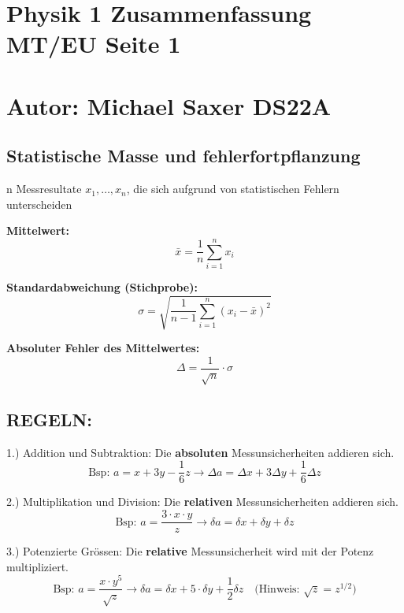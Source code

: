 \documentclass[a4paper, 8pt]{extarticle}
\begin{document}
\begin{landscape}
\section*{\hspace{10cm} Physik 1 Zusammenfassung MT/EU \hspace{8cm} \small Seite 1}
\section*{ \hspace{10cm} Autor: Michael Saxer DS22A}	%
	\begin{multicols*}{3}
\section{Statistische Masse und fehlerfortpflanzung}
n Messresultate \( x_1, \dots, x_n \), die sich aufgrund von statistischen Fehlern unterscheiden

\bigskip

\textbf{Mittelwert:}
\[
\bar{x} = \frac{1}{n} \sum_{i=1}^n x_i
\]

\bigskip

\textbf{Standardabweichung (Stichprobe):}
\[
\sigma = \sqrt{\frac{1}{n - 1} \sum_{i=1}^n (x_i - \bar{x})^2}
\]

\bigskip

\textbf{Absoluter Fehler des Mittelwertes:}
\[
\Delta = \frac{1}{\sqrt{n}} \cdot \sigma
\]
\subsection{REGELN:}

1.) Addition und Subtraktion: Die \textbf{absoluten} Messunsicherheiten addieren sich.
\[
\text{Bsp: } a = x + 3y - \frac{1}{6} z \rightarrow \Delta a = \Delta x + 3 \Delta y + \frac{1}{6} \Delta z
\]

2.) Multiplikation und Division: Die \textbf{relativen} Messunsicherheiten addieren sich.
\[
\text{Bsp: } a = \frac{3 \cdot x \cdot y}{z} \rightarrow \delta a = \delta x + \delta y + \delta z
\]

3.) Potenzierte Grössen: Die \textbf{relative} Messunsicherheit wird mit der Potenz multipliziert.
\[
\text{Bsp: } a = \frac{x \cdot y^5}{\sqrt{z}} \rightarrow \delta a = \delta x + 5 \cdot \delta y + \frac{1}{2} \delta z \quad \text{(Hinweis: } \sqrt{z} = z^{1/2}\text{)}
\]

\bigskip


\end{multicols*}
\end{landscape}
\end{document}
